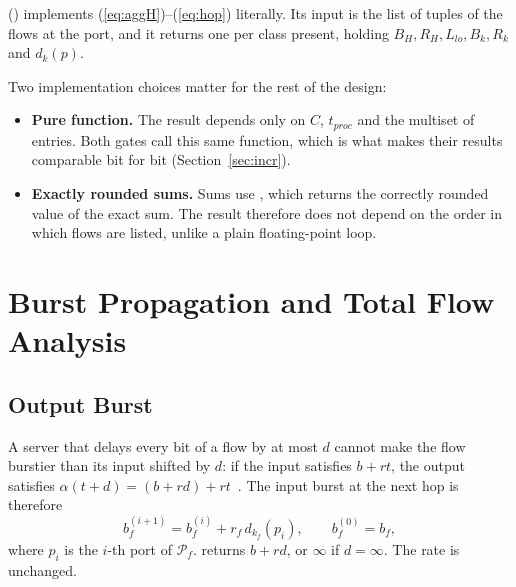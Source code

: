 \documentclass[9pt,a4paper,twocolumn,twoside]{tau-class/tau}
\newcommand{\src}[1]{../../src/tsn_gate/#1}
\providecommand{\eqref}[1]{(\ref{#1})}
\providecommand{\secref}[1]{Section~\ref{#1}}
\begin{document}
         () implements \eqref{eq:aggH}--\eqref{eq:hop} literally. Its input is the list of  tuples of the flows at the port, and it returns one  per class present, holding $B_H, R_H, L_{lo}, B_k, R_k$ and $d_k(p)$.

        \begin{code}
            }
            \caption{Per-port NP-SP bound \eqref{eq:hop} (\texttt{analysis.py}).}
            \label{lst:port}
        \end{code}

        Two implementation choices matter for the rest of the design:
        \begin{itemize}
            \item \textbf{Pure function.} The result depends only on $C$, $t_{proc}$ and the multiset of entries. Both gates call this same function, which is what makes their results comparable bit for bit (\secref{sec:incr}).
            \item \textbf{Exactly rounded sums.} Sums use , which returns the correctly rounded value of the exact sum. The result therefore does not depend on the order in which flows are listed, unlike a plain floating-point loop.
        \end{itemize}


\section{Burst Propagation and Total Flow Analysis}
\label{sec:prop}

    \subsection{Output Burst}

        A server that delays every bit of a flow by at most $d$ cannot make the flow burstier than its input shifted by $d$: if the input satisfies $b + r t$, the output satisfies $\alpha(t + d) = (b + r d) + r t$~\cite{leboudec2001nc}. The input burst at the next hop is therefore
        \begin{equation}\label{eq:burst}
            b^{(i+1)}_f = b^{(i)}_f + r_f\, d_{k_f}(p_i), \qquad b^{(0)}_f = b_f,
        \end{equation}
        where $p_i$ is the $i$-th port of $\mathcal{P}_f$.  returns $b + r d$, or $\infty$ if $d = \infty$. The rate is unchanged.
\end{document}
